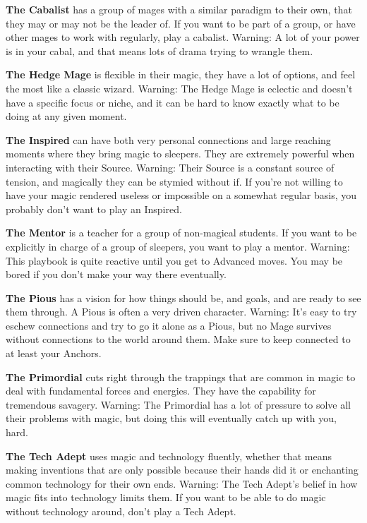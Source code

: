 \documentclass[
  oneside,
  statementpaper,
  9pt]{memoir}
\begin{document}
\textbf{The Cabalist} has a group of mages with a similar paradigm to
their own, that they may or may not be the leader of. If you want to be
part of a group, or have other mages to work with regularly, play a
cabalist. Warning: A lot of your power is in your cabal, and that means
lots of drama trying to wrangle them.

\textbf{The Hedge Mage} is flexible in their magic, they have a lot of
options, and feel the most like a classic wizard. Warning: The Hedge
Mage is eclectic and doesn't have a specific focus or niche, and it can
be hard to know exactly what to be doing at any given moment.

\textbf{The Inspired} can have both very personal connections and large
reaching moments where they bring magic to sleepers. They are extremely
powerful when interacting with their Source. Warning: Their Source is a
constant source of tension, and magically they can be stymied without
if. If you're not willing to have your magic rendered useless or
impossible on a somewhat regular basis, you probably don't want to play
an Inspired.

\textbf{The Mentor} is a teacher for a group of non-magical students. If
you want to be explicitly in charge of a group of sleepers, you want to
play a mentor. Warning: This playbook is quite reactive until you get to
Advanced moves. You may be bored if you don't make your way there
eventually.

\textbf{The Pious }has a vision for how things should be, and goals, and
are ready to see them through. A Pious is often a very driven character.
Warning: It's easy to try eschew connections and try to go it alone as a
Pious, but no Mage survives without connections to the world around
them. Make sure to keep connected to at least your Anchors.

\textbf{The Primordial} cuts right through the trappings that are common
in magic to deal with fundamental forces and energies. They have the
capability for tremendous savagery. Warning: The Primordial has a lot of
pressure to solve all their problems with magic, but doing this will
eventually catch up with you, hard.

\textbf{The Tech Adept} uses magic and technology fluently, whether that
means making inventions that are only possible because their hands did
it or enchanting common technology for their own ends. Warning: The Tech
Adept's belief in how magic fits into technology limits them. If you
want to be able to do magic without technology around, don't play a Tech
Adept.
\end{document}
